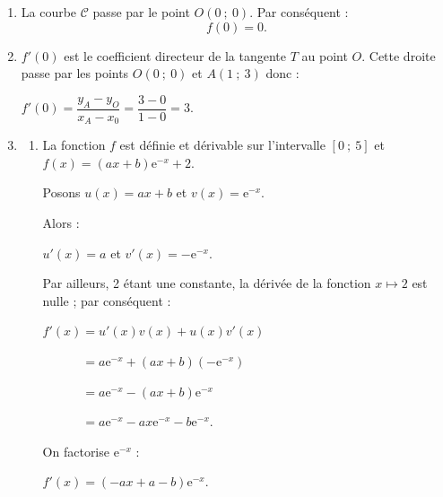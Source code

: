 \begin{corrige}
     \par
     \begin{enumerate}
          \item %
          La courbe $\mathscr{C}$ passe par le point $O(0~;~0)$. Par conséquent :
          \[ f(0)=0. \]
          \item %
          $f'(0)$ est le coefficient directeur de la tangente $T$ au point $O$. Cette droite passe par les points $O(0~;~0)$ et $A(1~;~3)$ donc :
          \par
          $f'(0)=\dfrac{y_A-y_O}{x_A-x_0}=\dfrac{3-0}{1-0}=3$.
          \item %
          \begin{enumerate}
               \item %
               La fonction $f$ est définie et dérivable sur l'intervalle $[0~;~5]$ et ${f(x)=(ax+b)\text{e}^{-x}+2}$.
               \par
               Posons $u(x)=ax+b$ et $v(x)=\text{e}^{-x}$.
               \par
               Alors :
               \par
               $u'(x)=a$ et $v'(x)=-\text{e}^{-x}$.
               \par
               Par ailleurs, 2 étant une constante, la dérivée de la fonction ${x \longmapsto 2}$ est nulle ; par conséquent :
               \par
               $f'(x)=u'(x)v(x)+u(x)v'(x)$
               \par
               $\phantom{f'(x)}=a \text{e}^{-x}+(ax+b)(-\text{e}^{-x})$
               \par
               $\phantom{f'(x)}=a \text{e}^{-x}-(ax+b)\text{e}^{-x}$
               \par
               $\phantom{f'(x)}=a \text{e}^{-x}-ax\text{e}^{-x} - b\text{e}^{-x}$.
               \par
               On factorise $\text{e}^{-x}$ :
               \par
               $f'(x)=(-ax+a-b)\text{e}^{-x}$.
               \par
\end{enumerate}
\end{enumerate}
\end{corrige}
